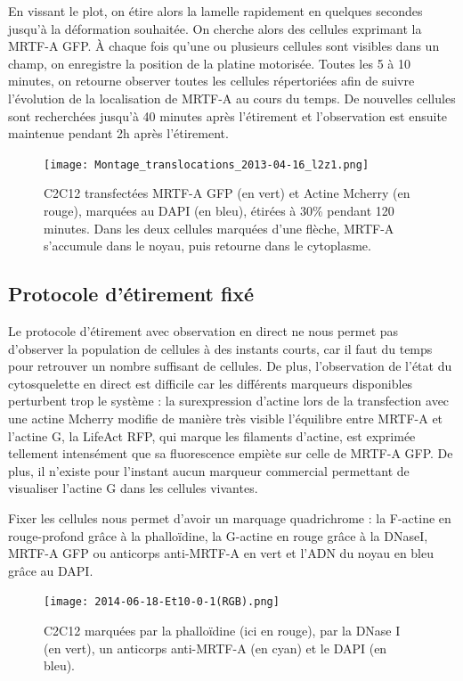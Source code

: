 	En vissant le plot, on étire alors la lamelle rapidement en quelques secondes jusqu'à la déformation souhaitée. On cherche alors des cellules exprimant la MRTF-A GFP. À chaque fois qu'une ou plusieurs cellules sont visibles dans un champ, on enregistre la position de la platine motorisée. Toutes les 5 à 10 minutes, on retourne observer toutes les cellules répertoriées afin de suivre l'évolution de la localisation de MRTF-A au cours du temps. De nouvelles cellules sont recherchées jusqu'à 40 minutes après l'étirement et l'observation est ensuite maintenue pendant 2h après l'étirement. 
	\begin{figure}
	\texttt{[image: Montage\_translocations\_2013-04-16\_l2z1.png]}
	\caption{C2C12 transfectées MRTF-A GFP (en vert) et Actine Mcherry (en rouge), marquées au DAPI (en bleu), étirées à 30\% pendant 120 minutes. Dans les deux cellules marquées d'une flèche, MRTF-A s'accumule dans le noyau, puis retourne dans le cytoplasme.}
	\label{Etirement_live}
	\end{figure}
	
	
	\subsection{Protocole d'étirement fixé}
	
	Le protocole d'étirement avec observation en direct ne nous permet pas d'observer la population de cellules à des instants courts, car il faut du temps pour retrouver un nombre suffisant de cellules. De plus, l'observation de l'état du cytosquelette en direct est difficile car les différents marqueurs disponibles perturbent trop le système : la surexpression d'actine lors de la transfection avec une actine Mcherry modifie de manière très visible l'équilibre entre MRTF-A et l'actine G, la LifeAct RFP, qui marque les filaments d'actine, est exprimée tellement intensément que sa fluorescence empiète sur celle de MRTF-A GFP. De plus, il n'existe pour l'instant aucun marqueur commercial permettant de visualiser l'actine G dans les cellules vivantes. 
	
	Fixer les cellules nous permet d'avoir un marquage quadrichrome : la F-actine en rouge-profond grâce à la phalloïdine, la G-actine en rouge grâce à la DNaseI, MRTF-A GFP ou anticorps anti-MRTF-A en vert et l'ADN du noyau en bleu grâce au DAPI. 
	
	\begin{figure}
	\texttt{[image: 2014-06-18-Et10-0-1(RGB).png]}
	\caption{C2C12 marquées par la phalloïdine (ici en rouge), par la DNase I (en vert), un anticorps anti-MRTF-A (en cyan) et le DAPI (en bleu).}
	\end{figure}
	

